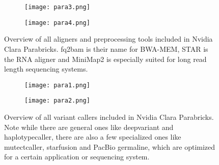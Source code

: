 \documentclass[conference]{IEEEtran}
\begin{document}
\begin{figure}[h]
    \centering
    \begin{subfigure}[b]{0.2\textwidth}
        \texttt{[image: para3.png]}
    \end{subfigure}
    \hspace{0.1cm} %
    \begin{subfigure}[b]{0.2\textwidth}
        \texttt{[image: para4.png]}
    \end{subfigure}
    \caption{Overview of all aligners and preprocessing tools included in Nvidia Clara Parabricks. fq2bam is their name for BWA-MEM, STAR is the RNA aligner and MiniMap2 is especially suited for long read length sequencing systems.}
\end{figure}


\begin{figure}[h]
    \centering
    \begin{subfigure}[b]{0.2\textwidth}
        \texttt{[image: para1.png]}
    \end{subfigure}
    \hspace{0.1cm} %
    \begin{subfigure}[b]{0.2\textwidth}
        \texttt{[image: para2.png]}
    \end{subfigure}
    \caption{Overview of all variant callers included in Nvidia Clara Parabricks. Note while there are general ones like deepvariant and haplotypecaller, there are also a few specialized ones like mutectcaller, starfusion and PacBio germaline, which are optimized for a certain application or sequencing system.}
\end{figure}
\end{document}
